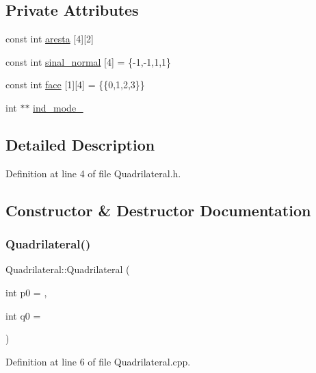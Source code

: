 \subsection*{Private Attributes}
\begin{DoxyCompactItemize}
\item 
const int \hyperlink{classQuadrilateral_a0d3d9601b47ed4d19d6b85a94b8a460f}{aresta} \mbox{[}4\mbox{]}\mbox{[}2\mbox{]}
\item 
const int \hyperlink{classQuadrilateral_a3d58a84a8ac0c9172e81ac99db38befa}{sinal\+\_\+normal} \mbox{[}4\mbox{]} = \{-\/1,-\/1,1,1\}
\item 
const int \hyperlink{classQuadrilateral_a2e61e221bbe8816b6b107d0535e1acfb}{face} \mbox{[}1\mbox{]}\mbox{[}4\mbox{]} = \{\{0,1,2,3\}\}
\item 
int $\ast$$\ast$ \hyperlink{classQuadrilateral_a396e8a8866c2685e6dc6bd16591c1617}{ind\+\_\+mode\+\_\+}
\end{DoxyCompactItemize}


\subsection{Detailed Description}


Definition at line 4 of file Quadrilateral.\+h.



\subsection{Constructor \& Destructor Documentation}
\mbox{\label{classQuadrilateral_a5ddfd0486cac12fca281f7352059c99c}} 
\subsubsection{\texorpdfstring{Quadrilateral()}{Quadrilateral()}}
{\footnotesize\ttfamily Quadrilateral\+::\+Quadrilateral (\begin{DoxyParamCaption}\item[{int}]{p0 = {},  }\item[{int}]{q0 = {} }\end{DoxyParamCaption})}



Definition at line 6 of file Quadrilateral.\+cpp.



